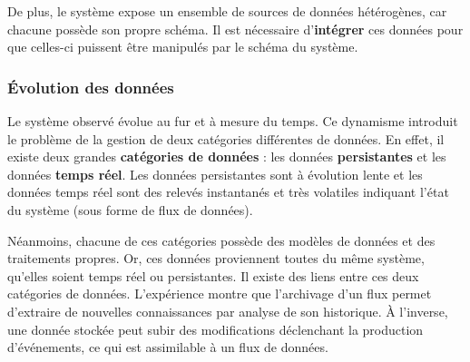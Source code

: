 De plus, le système expose un ensemble de sources de données hétérogènes, car chacune possède son propre schéma. Il est nécessaire d'\textbf{intégrer} ces données pour que celles-ci puissent être manipulés par le schéma du système.

\subsubsection{Évolution des données}
Le système observé évolue au fur et à mesure du temps. Ce dynamisme introduit le problème de la gestion de deux catégories différentes de données. En effet, il existe deux grandes \textbf{catégories de données} : les données \textbf{persistantes} et les données \textbf{temps réel}. Les données persistantes sont à évolution lente et les données temps réel sont des relevés instantanés et très volatiles indiquant l'état du système (sous forme de flux de données).

Néanmoins, chacune de ces catégories possède des modèles de données et des traitements propres. Or, ces données proviennent toutes du même système, qu'elles soient temps réel ou persistantes. Il existe des liens entre ces deux catégories de données. L'expérience montre que l'archivage d'un flux permet d'extraire de nouvelles connaissances par analyse de son historique. À l'inverse, une donnée stockée peut subir des modifications déclenchant la production d'événements, ce qui est assimilable à un flux de données.

